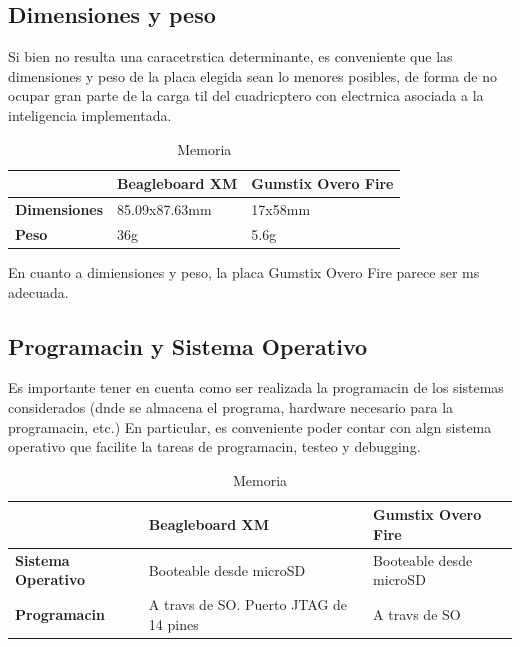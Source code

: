 \documentclass[spanish,12pt,a4paper,titlepage]{report}
\begin{document}
\subsection*{Dimensiones y peso}

Si bien no resulta una caracetrstica determinante, es conveniente que las dimensiones y peso de la placa elegida sean lo menores posibles, de forma de no ocupar gran parte de la carga til del cuadricptero con electrnica asociada a la inteligencia implementada.\\

\begin{table}[H]
\begin{tabular}{p{130pt}|p{130pt}|p{130pt}|} 
\cline{2-3}
& \cellcolor[gray]{0.8} \textbf{Beagleboard XM} 
& \cellcolor[gray]{0.8} \textbf{Gumstix Overo Fire} \\ \cline{1-3} \hline
\multicolumn{1}{|p{130pt}|}{\cellcolor[gray]{0.8}\textbf{Dimensiones}} 
&85.09x87.63mm &17x58mm\\ 
\hline 
\multicolumn{1}{|p{130pt}|}{\cellcolor[gray]{0.8}\textbf{Peso}} 
&36g &5.6g\\
\hline
\end{tabular}
\caption{Memoria}
\label{tab:memoria}
\end{table}
En cuanto a dimiensiones y peso, la placa Gumstix Overo Fire parece ser ms adecuada.

\subsection*{Programacin y Sistema Operativo}

Es importante tener en cuenta como ser realizada la programacin de los sistemas considerados (dnde se almacena el programa, hardware necesario para la programacin, etc.) En particular, es conveniente poder contar con algn sistema operativo que facilite la tareas de programacin, testeo y debugging.

\begin{table}[H]
\begin{tabular}{p{130pt}|p{130pt}|p{130pt}|} 
\cline{2-3}
& \cellcolor[gray]{0.8} \textbf{Beagleboard XM} 
& \cellcolor[gray]{0.8} \textbf{Gumstix Overo Fire} \\ \cline{1-3} \hline
\multicolumn{1}{|p{130pt}|}{\cellcolor[gray]{0.8}\textbf{Sistema Operativo}} 
&Booteable desde microSD &Booteable desde microSD\\ 
\hline 
\multicolumn{1}{|p{130pt}|}{\cellcolor[gray]{0.8}\textbf{Programacin}} 
&A travs de SO. Puerto JTAG de 14 pines &A travs de SO\\
\hline
\end{tabular}
\caption{Memoria}
\label{tab:memoria}
\end{table}
\end{document}
